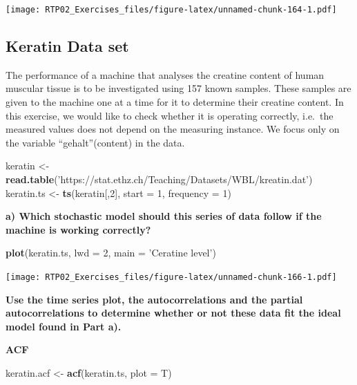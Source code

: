 \documentclass[
]{article}
\newenvironment{Shaded}{\begin{snugshade}}{\end{snugshade}}
\newcommand{\DataTypeTok}[1]{\textcolor[rgb]{0.13,0.29,0.53}{#1}}
\newcommand{\DecValTok}[1]{\textcolor[rgb]{0.00,0.00,0.81}{#1}}
\newcommand{\KeywordTok}[1]{\textcolor[rgb]{0.13,0.29,0.53}{\textbf{#1}}}
\newcommand{\NormalTok}[1]{#1}
\newcommand{\StringTok}[1]{\textcolor[rgb]{0.31,0.60,0.02}{#1}}
\begin{document}
\texttt{[image: RTP02\_Exercises\_files/figure-latex/unnamed-chunk-164-1.pdf]}

\hypertarget{keratin-data-set}{%
\subsection{Keratin Data set}\label{keratin-data-set}}

The performance of a machine that analyses the creatine content of human
muscular tissue is to be investigated using 157 known samples. These
samples are given to the machine one at a time for it to determine their
creatine content. In this exercise, we would like to check whether it is
operating correctly, i.e.~the measured values does not depend on the
measuring instance. We focus only on the variable ``gehalt''(content) in
the data.

\begin{Shaded}
\begin{Highlighting}[]
\NormalTok{keratin <-}\StringTok{ }\KeywordTok{read.table}\NormalTok{(}\StringTok{'https://stat.ethz.ch/Teaching/Datasets/WBL/kreatin.dat'}\NormalTok{)}
\NormalTok{keratin.ts <-}\StringTok{ }\KeywordTok{ts}\NormalTok{(keratin[,}\DecValTok{2}\NormalTok{], }\DataTypeTok{start =} \DecValTok{1}\NormalTok{, }\DataTypeTok{frequency =} \DecValTok{1}\NormalTok{)}
\end{Highlighting}
\end{Shaded}

\textbf{a) Which stochastic model should this series of data follow if
the machine is working correctly?}

\begin{Shaded}
\begin{Highlighting}[]
\KeywordTok{plot}\NormalTok{(keratin.ts, }\DataTypeTok{lwd =} \DecValTok{2}\NormalTok{, }\DataTypeTok{main =} \StringTok{'Ceratine level'}\NormalTok{)}
\end{Highlighting}
\end{Shaded}

\texttt{[image: RTP02\_Exercises\_files/figure-latex/unnamed-chunk-166-1.pdf]}

\textbf{Use the time series plot, the autocorrelations and the partial
autocorrelations to determine whether or not these data fit the ideal
model found in Part a).}

\textbf{ACF}

\begin{Shaded}
\begin{Highlighting}[]
\NormalTok{keratin.acf <-}\StringTok{ }\KeywordTok{acf}\NormalTok{(keratin.ts, }\DataTypeTok{plot =}\NormalTok{ T)}
\end{Highlighting}
\end{Shaded}
\end{document}
